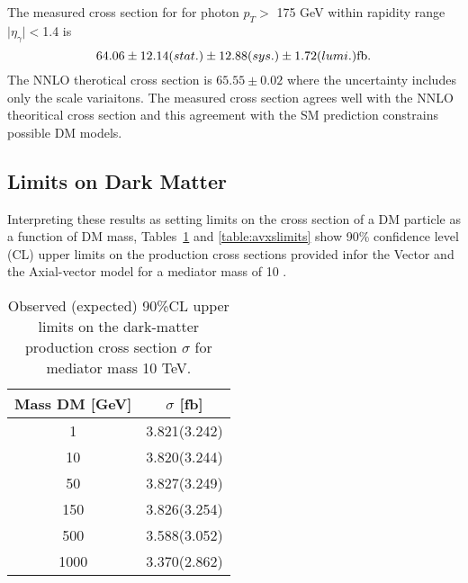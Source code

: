 The measured cross section for \ppzgnng  for photon $p_T >$ 175 GeV within
 rapidity range $\mid \eta_{\gamma}\mid < $1.4
 is 
\begin{equation}
 64.06 \pm 12.14({stat.}) \pm 12.88({sys.}) \pm 1.72({lumi.}) \mathrm{fb}.
\end{equation}
The NNLO therotical cross section is $65.55\pm 0.02$ \fb
  where the uncertainty includes only the scale variaitons. 
The measured cross section agrees well with the NNLO theoritical cross section
 and this agreement with the SM prediction constrains
 possible DM models.

 \subsection{Limits on Dark Matter}
\label{ssec:lim_DM}
Interpreting these results as setting limits on the
 cross section of a DM particle as a function of 
 DM mass, Tables~\ref{table:vxslimits} and \ref{table:avxslimits}
 show 90\% confidence level (CL) upper limits on the
 production cross sections provided infor the Vector
 and the Axial-vector model for a mediator mass of 10 \TeV. 


\begin{table}[ht]
\centering
\begin{tabular}{cc}
\hline\hline
Mass DM [GeV] & $\sigma$ [fb] \\
\hline
1  & 3.821(3.242)  \\  
\hline
10  & 3.820(3.244)  \\  
\hline
50  & 3.827(3.249) \\
\hline
150  & 3.826(3.254)\\
\hline 
500  & 3.588(3.052) \\
\hline
1000  & 3.370(2.862) \\
\hline
\end{tabular}
\caption{Observed (expected) 90\%CL upper limits on the dark-matter production cross section $\sigma$ for mediator mass 10 TeV. }
\label{table:vxslimits}
\end{table}




